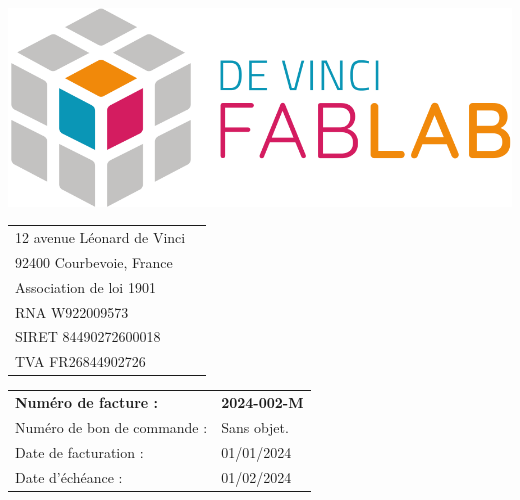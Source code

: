 \documentclass[11pt,a4paper]{article}
\begin{document}
\thispagestyle{empty}


\begin{minipage}{0.4\textwidth}
    \includegraphics[width=0.7\linewidth]{../assets/logo_fablab.png}

    \vspace{0.5cm}

    \begin{tabular}{ll}
        12 avenue Léonard de Vinci \\
        92400 Courbevoie, France   \\
        Association de loi 1901    \\
        RNA W922009573             \\
        SIRET 84490272600018       \\
        TVA  FR26844902726         \\
    \end{tabular}
\end{minipage}\begin{minipage}{0.6\textwidth}
    \begin{flushright}
        \begin{tabular}{ll}
            \textbf{Numéro de facture :} & \textbf{2024-002-M} \\
            Numéro de bon de commande :  & Sans objet.         \\
            Date de facturation :        & 01/01/2024          \\
            Date d'échéance :            & 01/02/2024          \\
        \end{tabular}
    \end{flushright}
\end{minipage}
\end{document}
